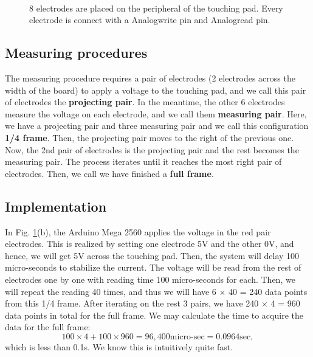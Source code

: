 \documentclass[reprint,amsmath, amsfonts, amssymb, aps, letterpaper]{revtex4-1}
\begin{document}
\begin{figure}
 	\\
\caption{8 electrodes are placed on the peripheral of the touching pad. Every electrode is connect with a Analogwrite pin and Analogread pin.}
 \label{fig::pad}
\end{figure}

\subsection{Measuring procedures}
The measuring procedure requires a pair of electrodes (2 electrodes across the width of the board) to apply a voltage to the touching pad, and we call this pair of electrodes the \textbf{projecting pair}. In the meantime, the other 6 electrodes measure the voltage on each electrode, and we call them \textbf{measuring pair}. Here, we have a projecting pair and three measuring pair and we call this configuration \textbf{1/4 frame}. Then, the projecting pair moves to the right of the previous one. Now, the 2nd pair of electrodes is the projecting pair and the rest becomes the measuring pair. The process iterates until it reaches the most right pair of electrodes. Then, we call we have finished a \textbf{full frame}.

\subsection{Implementation}
In Fig. \ref{fig::pad}(b), the Arduino Mega 2560 applies the voltage in the red pair electrodes. This is realized by setting one electrode 5V and the other 0V, and hence, we will get 5V across the touching pad. Then, the system will delay 100 micro-seconds to stabilize the current. The voltage will be read from the rest of electrodes one by one with reading time 100 micro-seconds for each. Then, we will repeat the reading 40 times, and thus we will have 6 $\times$ 40 = 240 data points from this 1/4 frame. After iterating on the rest 3 pairs, we have 240 $\times$ 4 = 960 data points in total for the full frame. We may calculate the time to acquire the data for the full frame:
\[ 100 \times 4 + 100 \times 960 = 96,400 \text{micro-sec}  = 0.0964 \text{sec},
\]
which is less than 0.1s. We know this is intuitively quite fast.
\end{document}
